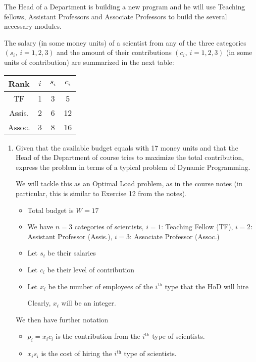 \begin{prob} %
The Head of a Department is building a new program and he will
use Teaching fellows, Assistant Professors and Associate Professors to build the several necessary modules.

The salary (in some money units) of a scientist from any of the three categories $(s_i, \ i = 1, 2, 3)$ and the amount of their contributions $(c_i, \ i = 1, 2, 3)$ (in some units of contribution) are summarized in the next table:

\begin{tabular}{||c||c|c|c||} \hline
  Rank   & $i$ & $s_i$ & $c_i$  \\ \hline
  TF     & 1 & 3 & 5   \\ \hline
  Assis. & 2 & 6 & 12  \\ \hline
  Assoc. & 3 & 8 & 16  \\ \hline
\end{tabular}

\begin{enumerate}[label = {\textbf{(\greek*)}}]
    \item Given that the available budget equals with 17 money units and that the Head of the Department of course tries to maximize the total contribution, express the problem in terms of a typical problem of Dynamic Programming.
    
    \begin{sol}
We will tackle this as an Optimal Load problem, as in the course notes (in particular, this is similar to Exercise 12 from the notes).

\begin{itemize}
    \item Total budget is $W=17$
    \item We have $n=3$ categories of scientists, $i=1$: Teaching Fellow (TF), $i=2$: Assistant Professor (Assis.), $i=3$: Associate Professor (Assoc.)
    \item Let $s_i$ be their salaries
    \item Let $c_i$ be their level of contribution
    \item Let $x_i$ be the number of employees of the $i^{\text{th}}$ type that the HoD will hire
    
    Clearly, $x_i$ will be an integer.
\end{itemize}

We then have further notation
\begin{itemize}
    \item $p_i=x_i c_i$ is the contribution from the $i^\text{th}$ type of scientists.
    \item $x_i s_i$ is the cost of hiring the $i^\text{th}$ type of scientists.
\end{itemize}


\end{sol}
\end{enumerate}
\end{prob}
